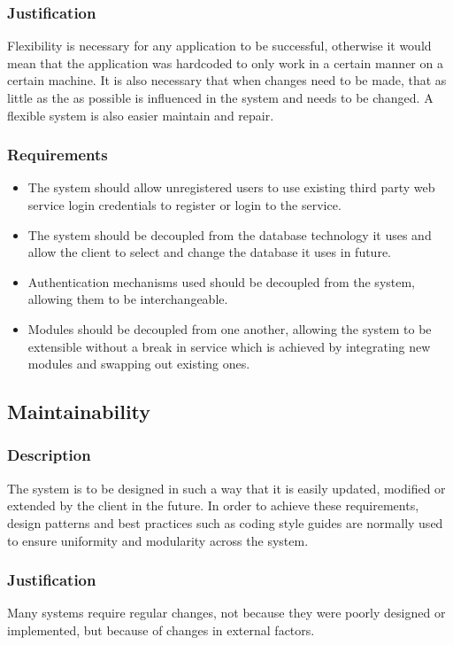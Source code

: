 \documentclass[11pt,fleqn]{book} %
\begin{document}
			\subsubsection{Justification}
				Flexibility is necessary for any application to be successful, otherwise it would mean that the application was hardcoded to only work in a certain manner on a certain machine. It is also necessary that when changes need to be made, that as little as the as possible is influenced in the system and needs to be changed. A flexible system is also easier maintain and repair.
			\subsubsection{Requirements}
				\begin{itemize}
					\item The system should allow unregistered users to use existing third party web service login credentials to register or login to the service.
					\item The system should be decoupled from the database technology it uses and allow the client to select and change the database it uses in future.
					\item Authentication mechanisms used should be decoupled from the system, allowing them to be interchangeable.
					\item Modules should be decoupled from one another, allowing the system to be extensible without a break in service which is achieved by integrating new modules and swapping out existing ones.
				\end{itemize}
		\subsection{Maintainability}
			\subsubsection{Description}
				The system is to be designed in such a way that it is easily updated, modified or extended by the client in the future. In order to achieve these requirements, design patterns and best practices such as coding style guides are normally used to ensure uniformity and modularity across the system.
			\subsubsection{Justification}
				Many systems require regular changes, not because they were poorly designed or implemented, but because of changes in external factors.
\end{document}
